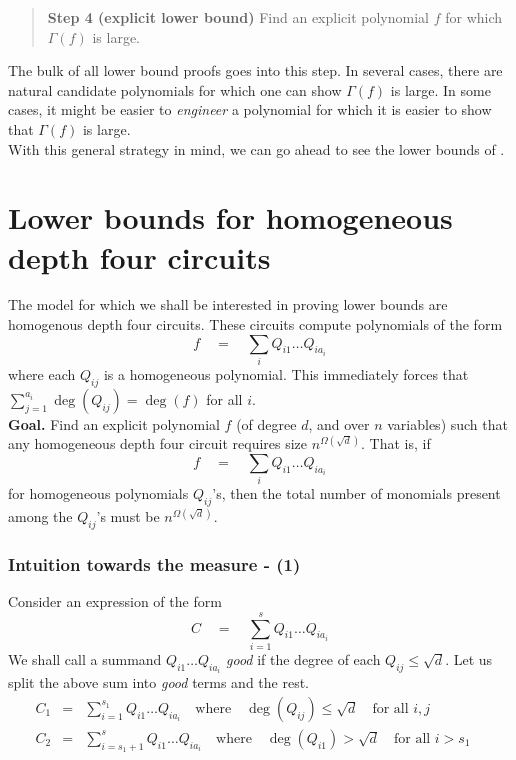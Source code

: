 \documentclass{beatcs}
\newcommand{\spaced}[1]{\quad#1\quad}
\begin{document}
\begin{quote}
{\bf Step 4 (explicit lower bound)} Find an explicit polynomial $f$ for which $\Gamma(f)$ is large. 
\end{quote} 

The bulk of all lower bound proofs goes into this step. In several cases, there are natural candidate polynomials for which one can show $\Gamma(f)$ is large. In some cases, it might be easier to \emph{engineer} a polynomial for which it is easier to show that $\Gamma(f)$ is large. \\

With this general strategy in mind, we can go ahead to see the lower bounds of \cite{KLSS, KS14}. 

\section{Lower bounds for homogeneous depth four circuits}\label{sec:hom-d4-lb}

The model for which we shall be interested in proving lower bounds are homogenous depth four circuits. These circuits compute polynomials of the form
\[
f \spaced{=} \sum_{i} Q_{i1}\dots Q_{ia_i}
\]
where each $Q_{ij}$ is a homogeneous polynomial. This immediately forces that $\sum_{j=1}^{a_i} \deg(Q_{ij}) = \deg(f)$ for all $i$. \\

{\bf Goal. } Find an explicit polynomial $f$ (of degree $d$, and over $n$ variables) such that any homogeneous depth four circuit requires size $n^{\Omega(\sqrt{d})}$. That is, if
\[
f \spaced{=} \sum_{i} Q_{i1}\dots Q_{ia_i}
\]
for homogeneous polynomials $Q_{ij}$'s, then the total number of monomials present among the $Q_{ij}$'s must be $n^{\Omega(\sqrt{d})}$. 

\subsubsection*{Intuition towards the measure - (1)}

Consider an expression of the form
\[
C \spaced{=} \sum_{i=1}^s Q_{i1}\dots Q_{ia_i}
\]
We shall call a summand $Q_{i1}\dots Q_{ia_i}$ \emph{good} if the degree of each $Q_{ij} \leq \sqrt{d}$. Let us split the above sum into \emph{good} terms and the rest. 
\begin{eqnarray}
C_1 &=& \sum_{i=1}^{s_1} Q_{i1}\dots Q_{ia_i} \spaced{\text{where}} \deg(Q_{ij}) \leq \sqrt{d} \spaced{\text{for all $i,j$}}\label{eqn:int11}\\
C_2 &=& \sum_{i=s_1+1}^{s} Q_{i1}\dots Q_{ia_i} \spaced{\text{where}} \deg(Q_{i1}) > \sqrt{d} \spaced{\text{for all $i > s_1$}}\label{eqn:int12}
\end{eqnarray}
\end{document}
